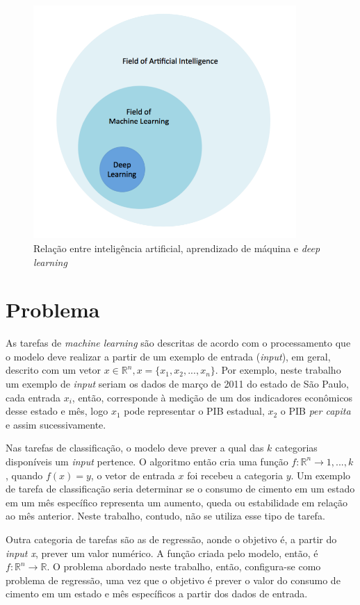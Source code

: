\begin{figure}[H] 
  \includegraphics[width= 10cm]{../figuras/ia_ml.png}
  \caption{Relação entre inteligência artificial, aprendizado de máquina e \textit{deep learning} \cite{dl-oreilly}}
\end{figure}

\section{Problema}

As tarefas de \textit{machine learning} são descritas de acordo com o processamento 
que o modelo deve realizar a partir de um exemplo de entrada (\textit{input}), em geral, descrito com 
um vetor $x \in \mathbb{R}^n, x=\{x_1, x_2, ..., x_n\}$. Por exemplo, neste trabalho um 
exemplo de \textit{input} seriam os dados 
de março de 2011 do estado de São Paulo, cada entrada $x_i$, então, corresponde à medição 
de um dos indicadores econômicos desse estado e mês, logo $x_1$ pode representar
o PIB estadual, $x_2$ o PIB \textit{per capita} e assim sucessivamente. 

Nas tarefas de classificação, o modelo deve prever a qual das $k$ categorias 
disponíveis um \textit{input} pertence. O algoritmo então cria uma função  
$ f : \mathbb{R}^n \rightarrow {1,...,k}$,  quando 
$ f(x) = y$, o vetor de entrada $x$ foi recebeu a categoria $y$. Um exemplo 
de tarefa de classificação seria determinar se o consumo de cimento em um estado em um mês específico 
representa um aumento, queda ou estabilidade em relação ao mês anterior. 
Neste trabalho, contudo, não se utiliza esse tipo de tarefa.\cite{Goodfellow-et-al-2016}

Outra categoria de tarefas são as de regressão, aonde o objetivo é, a partir do \textit{input x}, 
prever um valor numérico. A função criada pelo modelo, então, é $ f : \mathbb{R}^n \rightarrow \mathbb{R}$. 
O problema abordado neste trabalho, então, configura-se como problema de regressão, uma vez que o objetivo 
é prever o valor do consumo de cimento em um estado e mês específicos a partir dos dados de entrada.

